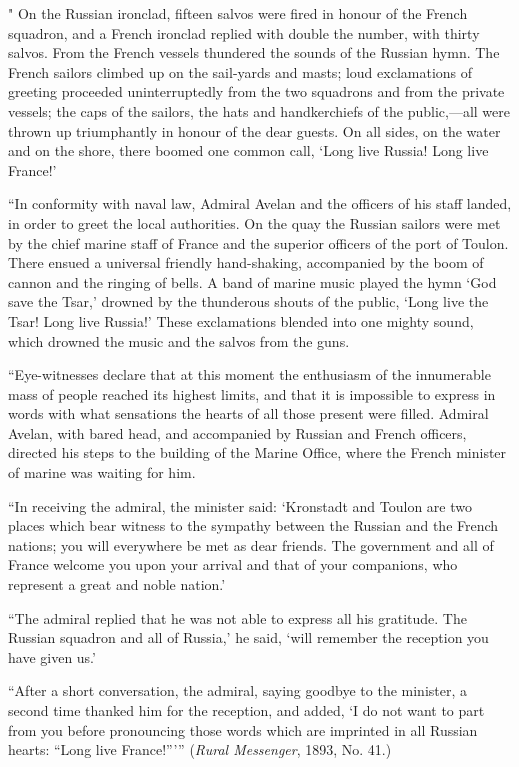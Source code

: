 \documentclass{book}
\begin{document}
" On the Russian ironclad, fifteen salvos were fired in honour of the French squadron, and a French ironclad replied with double the number, with thirty salvos. From the French vessels thundered the sounds of the Russian hymn. The French sailors climbed up on the sail-yards and masts; loud exclamations of greeting proceeded uninterruptedly from the two squadrons and from the private vessels; the caps of the sailors, the hats and handkerchiefs of the public,—all were thrown up triumphantly in honour of the dear guests. On all sides, on the water and on the shore, there boomed one common call, ‘Long live Russia! Long live France!’

“In conformity with naval law, Admiral Avelan and the officers of his staff landed, in order to greet the local authorities. On the quay the Russian sailors were met by the chief marine staff of France and the superior officers of the port of Toulon. There ensued a universal friendly hand-shaking, accompanied by the boom of cannon and the ringing of bells. A band of marine music played the hymn ‘God save the Tsar,’ drowned by the thunderous shouts of the public, ‘Long live the Tsar! Long live Russia!’ These exclamations blended into one mighty sound, which drowned the music and the salvos from the guns.

“Eye-witnesses declare that at this moment the enthusiasm of the innumerable mass of people reached its highest limits, and that it is impossible to express in words with what sensations the hearts of all those present were filled. Admiral Avelan, with bared head, and accompanied by Russian and French officers, directed his steps to the building of the Marine Office, where the French minister of marine was waiting for him.

“In receiving the admiral, the minister said: ‘Kronstadt and Toulon are two places which bear witness to the sympathy between the Russian and the French nations; you will everywhere be met as dear friends. The government and all of France welcome you upon your arrival and that of your companions, who represent a great and noble nation.’

“The admiral replied that he was not able to express all his gratitude. The Russian squadron and all of Russia,’ he said, ‘will remember the reception you have given us.’

“After a short conversation, the admiral, saying goodbye to the minister, a second time thanked him for the reception, and added, ‘I do not want to part from you before pronouncing those words which are imprinted in all Russian hearts: “Long live France!”’” (\emph{Rural Messenger}, 1893, No. 41.)
\end{document}

